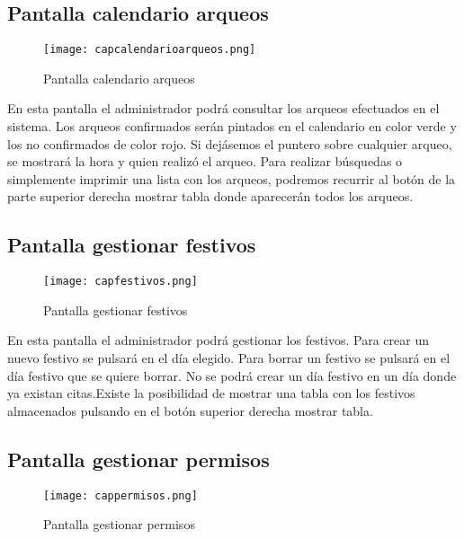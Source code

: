 \newpage
\subsection {Pantalla calendario arqueos}

\begin{figure}[!htb]
  \centering
    \texttt{[image: capcalendarioarqueos.png]}
  \caption{Pantalla calendario arqueos}
  \label{a}
\end{figure}

En esta pantalla el administrador podrá consultar los arqueos efectuados en el sistema. Los arqueos confirmados serán pintados en el calendario en color verde y los no confirmados de color rojo. Si dejásemos el puntero sobre cualquier arqueo, se mostrará la hora y quien realizó el arqueo. Para realizar búsquedas o simplemente imprimir una lista con los arqueos, podremos recurrir al botón de la parte superior derecha mostrar tabla donde aparecerán todos los arqueos.


\newpage
\subsection {Pantalla gestionar festivos}

\begin{figure}[!htb]
  \centering
    \texttt{[image: capfestivos.png]}
  \caption{Pantalla gestionar festivos}
  \label{a}
\end{figure}

En esta pantalla el administrador podrá gestionar los festivos. Para crear un nuevo festivo se pulsará en el día elegido. Para borrar un festivo se pulsará en el día festivo que se quiere borrar. No se podrá crear un día festivo en un día donde ya existan citas.Existe la posibilidad de mostrar una tabla con los festivos almacenados pulsando en el botón superior derecha mostrar tabla.

\newpage
\subsection {Pantalla gestionar permisos}

\begin{figure}[!htb]
  \centering
    \texttt{[image: cappermisos.png]}
  \caption{Pantalla gestionar permisos}
  \label{a}
\end{figure}

